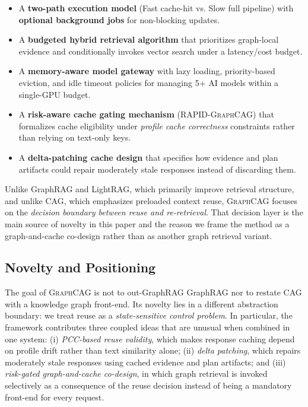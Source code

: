 \documentclass[11pt,a4paper,twocolumn]{article}
\newcommand{\graphcag}{\textsc{GraphCAG}}
\newcommand{\rapid}{\textsc{RAPID-GraphCAG}}
\begin{document}
\begin{itemize}[leftmargin=*]
  \item A \textbf{two-path execution model} (Fast cache-hit vs. Slow full pipeline) with \textbf{optional background jobs} for non-blocking updates.
  \item A \textbf{budgeted hybrid retrieval algorithm} that prioritizes graph-local evidence and conditionally invokes vector search under a latency/cost budget.
  \item A \textbf{memory-aware model gateway} with lazy loading, priority-based eviction, and idle timeout policies for managing 5+ AI models within a single-GPU budget.
  \item A \textbf{risk-aware cache gating mechanism} (\rapid{}) that formalizes cache eligibility under \emph{profile cache correctness} constraints rather than relying on text-only keys.
  \item A \textbf{delta-patching cache design} that specifies how evidence and plan artifacts could repair moderately stale responses instead of discarding them.
\end{itemize}

Unlike GraphRAG and LightRAG, which primarily improve retrieval structure, and unlike CAG, which emphasizes preloaded context reuse, \graphcag{} focuses on the \emph{decision boundary between reuse and re-retrieval}. That decision layer is the main source of novelty in this paper and the reason we frame the method as a graph-and-cache co-design rather than as another graph retrieval variant.

\subsection{Novelty and Positioning}

The goal of \graphcag{} is not to out-GraphRAG GraphRAG nor to restate CAG with a knowledge graph front-end. Its novelty lies in a different abstraction boundary: we treat reuse as a \emph{state-sensitive control problem}. In particular, the framework contributes three coupled ideas that are unusual when combined in one system: (i) \emph{PCC-based reuse validity}, which makes response caching depend on profile drift rather than text similarity alone; (ii) \emph{delta patching}, which repairs moderately stale responses using cached evidence and plan artifacts; and (iii) \emph{risk-gated graph-and-cache co-design}, in which graph retrieval is invoked selectively as a consequence of the reuse decision instead of being a mandatory front-end for every request.
\end{document}
